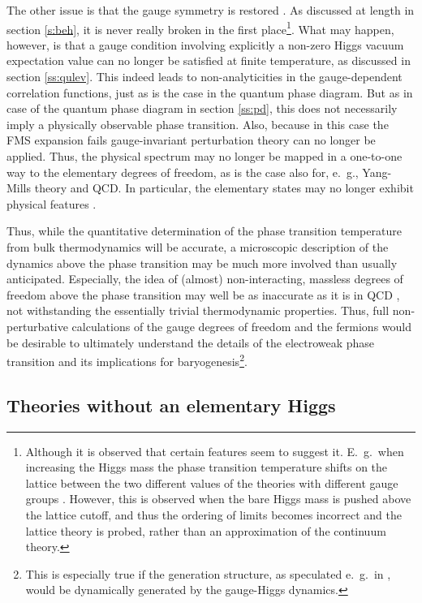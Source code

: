 \documentclass[final,12pt]{article}
\newcommand*{\1}{1\!\!\!\bot}
\begin{document}
The other issue is that the gauge symmetry is restored \cite{Kapusta:2006pm}. As discussed at length in section \ref{s:beh}, it is never really broken in the first place\footnote{Although it is observed that certain features seem to suggest it. E.\ g.\ when increasing the Higgs mass the phase transition temperature shifts on the lattice between the two different values of the theories with different gauge groups \cite{Brower:1982yn,Kikugawa:1985ex,Wellegehausen:2011sc}. However, this is observed when the bare Higgs mass is pushed above the lattice cutoff, and thus the ordering of limits becomes incorrect and the lattice theory is probed, rather than an approximation of the continuum theory.}. What may happen, however, is that a gauge condition involving explicitly a non-zero Higgs vacuum expectation value can no longer be satisfied at finite temperature, as discussed in section \ref{ss:qulev}. This indeed leads to non-analyticities in the gauge-dependent correlation functions, just as is the case in the quantum phase diagram. But as in case of the quantum phase diagram in section \ref{ss:pd}, this does not necessarily imply a physically observable phase transition. Also, because in this case the FMS expansion fails gauge-invariant perturbation theory can no longer be applied. Thus, the physical spectrum may no longer be mapped in a one-to-one way to the elementary degrees of freedom, as is the case also for, e.\ g., Yang-Mills theory and QCD. In particular, the elementary states may no longer exhibit physical features \cite{Maas:2011se}.

Thus, while the quantitative determination of the phase transition temperature from bulk thermodynamics will be accurate, a microscopic description of the dynamics above the phase transition may be much more involved than usually anticipated. Especially, the idea of (almost) non-interacting, massless degrees of freedom above the phase transition may well be as inaccurate as it is in QCD \cite{Maas:2011se}, not withstanding the essentially trivial thermodynamic properties. Thus, full non-perturbative calculations of the gauge degrees of freedom and the fermions would be desirable to ultimately understand the details of the electroweak phase transition and its implications for baryogenesis\footnote{This is especially true if the generation structure, as speculated e.\ g.\ in \cite{Egger:2017tkd}, would be dynamically generated by the gauge-Higgs dynamics.}.

\subsection{Theories without an elementary Higgs}\label{ss:tc}
\end{document}
